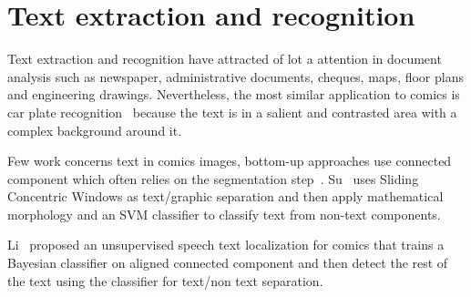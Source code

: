 \section{Text extraction and recognition}
\label{sec:sota:text}



Text extraction and recognition have attracted of lot a attention in document analysis such as newspaper, administrative documents, cheques, maps, floor plans and engineering drawings. 
Nevertheless, the most similar application to comics is car plate recognition~\cite{anagnostopoulos2008license} because the text is in a salient and contrasted area with a complex background around it.

Few work concerns text in comics images, bottom-up approaches use connected component which often relies on the segmentation step~\cite{ponsard2012ocr}.
Su~\cite{Su11} uses Sliding Concentric Windows as text/graphic separation and then apply mathematical morphology and an SVM classifier to classify text from non-text components. 

Li~\cite{Li2013Unsupervised} proposed an unsupervised speech text localization for comics that trains a Bayesian classifier on aligned connected component and then detect the rest of the text using the classifier for text/non text separation.
 



